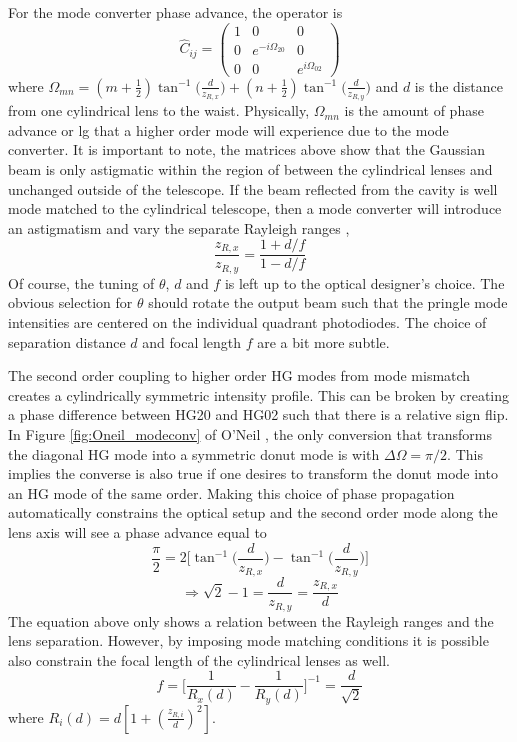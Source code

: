 For the mode converter phase advance, the operator is
\begin{equation} \label{convert}
\hat{C}_{ij} = 
\begin{pmatrix}
1			&0						& 0 
\\ 	0			&e^{-i \Omega_{20}}		& 0
\\ 	0			&0						&e^{i \Omega_{02}}			

\end{pmatrix}
\end{equation}
where $ \Omega_{mn} = (m+\frac{1}{2}) \tan^{-1}\bigg(\frac{d}{z_{R,x}}\bigg) + (n+\frac{1}{2}) \tan^{-1}\bigg(\frac{d}{z_{R,y}}\bigg) $ and $d$ is the distance from one cylindrical lens to the waist.  Physically, $\Omega_{mn}$ is the amount of phase advance or lg that a higher order mode will experience due to the mode converter.  It is important to note, the matrices above show that the Gaussian beam is only astigmatic within the region of between the cylindrical lenses and unchanged outside of the telescope.   If the beam reflected from the cavity is well mode matched to the cylindrical telescope, then a mode converter will introduce an astigmatism and vary the separate Rayleigh ranges \cite{BEIJERSBERGEN},
\begin{equation}
\frac{z_{R,x}}{z_{R,y}} = \frac{1+d/f}{1-d/f}
\end{equation}
Of course, the tuning of $\theta$, $d$ and $f$ is left up to the optical designer's choice.  The obvious selection for $\theta$ should rotate the output beam such that the pringle mode intensities are centered on the individual quadrant photodiodes.  The choice of separation distance $d$ and focal length $f$ are a bit more subtle.  

The second order coupling to higher order HG modes from mode mismatch creates a cylindrically symmetric intensity profile.  This can be broken by creating a phase difference between HG20 and HG02 such that there is a relative sign flip.  In Figure \ref{fig:Oneil_modeconv} of O'Neil \cite{ONeilModeTransform}, the only conversion that transforms the diagonal HG mode into a symmetric donut mode is with $\Delta \Omega = \pi/2$. This implies the converse is also true if one desires to transform the donut mode into an HG mode of the same order. Making this choice of phase propagation automatically constrains the optical setup and the second order mode along the lens axis will see a phase advance equal to
	\begin{equation}
	\frac{\pi}{2} = 2\bigg[\tan^{-1}\bigg(\frac{d}{z_{R,x}}\bigg) - \tan^{-1} \bigg(\frac{d}{z_{R,y}} \bigg)  \bigg]
	\end{equation} 
	\begin{equation}
	  \Rightarrow \sqrt{2} - 1 = \frac{d}{z_{R,y}} = \frac{z_{R,x}}{d}
	\end{equation}
The equation above only shows a relation between the Rayleigh ranges and the lens separation. However, by imposing mode matching conditions it is possible also constrain the focal length of the cylindrical lenses as well.
	\begin{equation}
	f = \bigg[\frac{1}{R_x(d)} - \frac{1}{R_y(d)}\bigg]^{-1} = \frac{d}{\sqrt{2}}
	\end{equation}
	where $R_i(d) = d [ 1 + (\frac{z_{R,i}}{d})^2]$.

